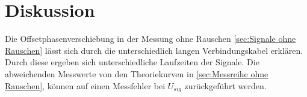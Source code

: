 \section{Diskussion}
\label{sec:Diskussion}
Die Offsetphasenverschiebung in der Messung ohne Rauschen \eqref{sec:Signale ohne Rauschen}
lässt sich durch die unterschiedlich langen Verbindungskabel erklären. Durch diese
ergeben sich unterschiedliche Laufzeiten der Signale. Die abweichenden Messwerte
von den Theoriekurven in \eqref{sec:Messreihe ohne Rauschen}, können auf einen
Messfehler bei $U_{sig}$ zurückgeführt werden.

